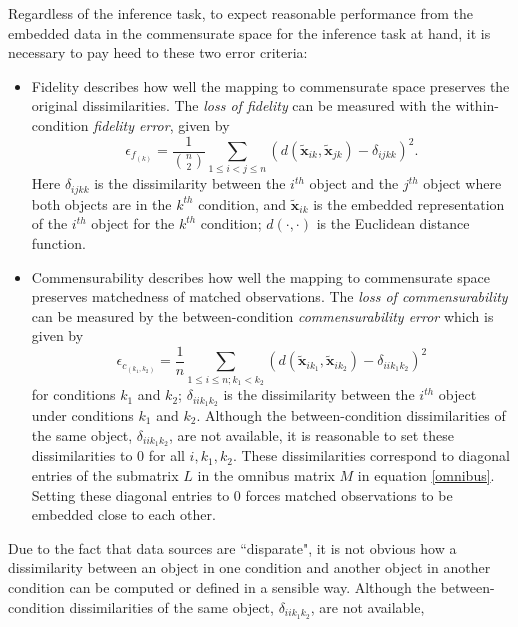 \documentclass[12pt,oneside,final]{thesis}\usepackage[]{graphicx}\usepackage[]{color}
\begin{document}
Regardless of the inference task,  to expect reasonable performance from the embedded data in the commensurate space  for the inference task at hand, 
it is necessary to pay heed to these two error criteria: %
\begin{itemize}
\item Fidelity describes how well the mapping to commensurate space preserves the original dissimilarities. The \emph{loss of fidelity} can be measured with the  within-condition \emph{ fidelity error}, given by
    \[
\epsilon_{f_{(k)}} = \frac{1}{{{n}\choose{2}}} \sum_{1 \leq i < j \leq n} (d(\widetilde{\bm{x}}_{ik},\widetilde{\bm{x}}_{jk})-\delta_{ijkk})^2
.\] 
Here $\delta_{ijkk}$ is the dissimilarity between the $i^{th}$ object and the $j^{th}$ object where both objects are in the $k^{th}$  condition, and $\widetilde{\bm{x}}_{ik}$ is the embedded representation of the $i^{th}$ object  for the $k^{th}$ condition;  $d(\cdot,\cdot)$ is the Euclidean distance function.

\item Commensurability describes how well the mapping to commensurate space preserves matchedness of matched observations. The \emph{loss of commensurability} can be measured by the between-condition {\em commensurability error} which is given by
    \[
\epsilon_{c_{(k_1,k_2)}} = \frac{1}{n} \sum_{1 \leq i \leq n;k_1 <k_2} (d(\widetilde{\bm{x}}_{ik_1},\widetilde{\bm{x}}_{ik_2})- { \delta_{iik_1k_2}})^2
\label{comm-error}
\]
 for conditions $k_1$ and $k_2$; $\delta_{iik_1k_2}$  is the dissimilarity between the $i^{th}$ object under  conditions   $k_1$ and  $k_2$. 
Although  the between-condition dissimilarities of the same object, ${ \delta_{iik_1k_2}}$, are not available,  it is reasonable to set these dissimilarities to $0$ for all $i,k_1,k_2$. These dissimilarities correspond to  diagonal  entries of the  submatrix $L$ in  the omnibus matrix  $M$ in equation \eqref{omnibus}. Setting these diagonal entries to $0$ forces matched observations to be embedded close to each other. \label{commens}  
\end{itemize}
 Due to the fact that data sources are ``disparate", it is not obvious how  a dissimilarity between an object in one condition and another object in another condition  can be computed or  defined in a sensible way. Although  the between-condition dissimilarities of the same object, ${ \delta_{iik_1k_2}}$, are not available,
\end{document}
